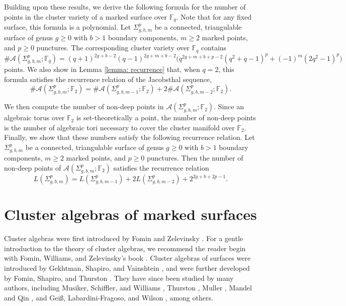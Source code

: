 \documentclass[reqno,12pt]{amsart}
\newenvironment{mythm}[1]
  {\renewcommand\theinnercustomthm{#1}\innercustomthm}
  {\endinnercustomthm}
\theoremstyle{definition}
\theoremstyle{remark}
\theoremstyle{remark}
\numberwithin{equation}{section}
\begin{document}
Building upon these results, we derive the following formula for the number of points in the cluster variety of a marked surface over $\mathbb{F}_q$. Note that for any fixed surface, this formula is a polynomial. 
\begin{mythm}{\ref{thm: punctured count full}}
    Let $\Sigma_{g,b,m}^p$ be a connected, triangulable surface of genus $g \geq 0$ with $b>1$ boundary components, $m\geq 2$ marked points, and $p\geq 0$ punctures. 
    The corresponding cluster variety over $\mathbb{F}_q$ contains 
    \[ \#\mathcal{A}(\Sigma_{g,b,m}^p; \mathbb{F}_q) = (q+1)^{2g+b-2} (q-1)^{2g+m+b-2} \big( q^{2g+m+b+p-2} (q^2+q-1)^p + (-1)^m (2q^2-1)^p \big) \]
    points.
\end{mythm}
We also show in Lemma \ref{lemma: recurrence} that, when $q=2$, this formula satisfies the recurrence relation of the Jacobsthal sequence, 
\[ \#\mathcal{A}(\Sigma_{g,b,m}^p; \mathbb{F}_2) = \#\mathcal{A}(\Sigma_{g,b,m-1}^p; \mathbb{F}_2) + 2 \#\mathcal{A}(\Sigma_{g,b,m-2}^p; \mathbb{F}_2). \]

We then compute the number of non-deep points in $\mathcal{A}(\Sigma_{g,b,m}^p ; \mathbb{F}_2)$. Since an algebraic torus over $\mathbb{F}_2$ is set-theoretically a point, the number of non-deep points is the number of algebraic tori necessary to cover the cluster manifold over $\mathbb{F}_2$.
Finally, we show that these numbers satisfy the following recurrence relation. 
\begin{mythm}{\ref{thm: nondeep recurrence}}
	Let $\Sigma_{g,b,m}^p$ be a connected, triangulable surface of genus $g \geq 0$ with $b>1$ boundary components, $m\geq 2$ marked points, and $p\geq 0$ punctures. 
	Then the number of non-deep points of $\mathcal{A}(\Sigma_{g,b,m}^p; \mathbb{F}_2)$ satisfies the recurrence relation 
	\[ L(\Sigma_{g,b,m}^p) = L(\Sigma_{g,b,m-1}^p) + 2 L(\Sigma_{g,b,m-2}^p) + 2^{2g+b+2p-1}. \]
\end{mythm}


\section{Cluster algebras of marked surfaces}

Cluster algebras were first introduced by Fomin and Zelevinsky \cite{FZ02}. For a gentle introduction to the theory of cluster algebras, we recommend the reader begin with Fomin, Williams, and Zelevinsky's book \cite{FWZChapters123, FWZChapters45}. 
Cluster algebras of surfaces were introduced by Gekhtman, Shapiro, and Vainshtein \cite{GSV05}, and were further developed by Fomin, Shapiro, and Thurston \cite{FST08, FT18}. They have since been studied by many authors, including Musiker, Schiffler, and Williams \cite{MSW11,MW13,MSW13}, Thurston \cite{Thu14}, Muller \cite{Mul16}, Mandel and Qin \cite{MQarxiv}, and Gei\ss, Labardini-Fragoso, and Wilson \cite{GLFWarxiv}, among others. 
\end{document}
